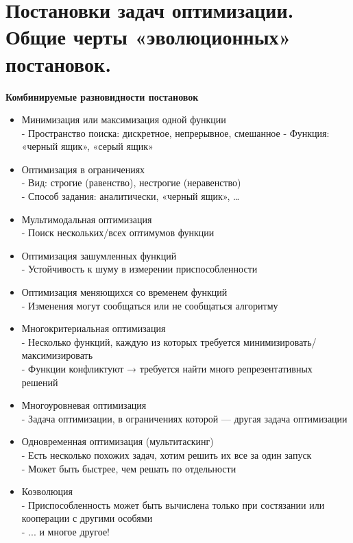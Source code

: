 \section{Постановки задач оптимизации. Общие черты «эволюционных» постановок.}
\begin{center}
     \textbf{Комбинируемые разновидности постановок\\}
\end{center}
\begin{itemize}
\item Минимизация или максимизация одной функции\\
- Пространство поиска: дискретное, непрерывное, смешанное
- Функция: «черный ящик», «серый ящик»
\item Оптимизация в ограничениях\\
- Вид: строгие (равенство), нестрогие (неравенство)\\
- Способ задания: аналитически, «черный ящик», …
\item Мультимодальная оптимизация\\
- Поиск нескольких/всех оптимумов функции
\item Оптимизация зашумленных функций \\
- Устойчивость к шуму в измерении приспособленности
\item Оптимизация меняющихся со временем функций\\
- Изменения могут сообщаться или не сообщаться алгоритму
\item Многокритериальная оптимизация\\
- Несколько функций, каждую из которых требуется минимизировать/максимизировать\\
- Функции конфликтуют → требуется найти много репрезентативных решений
\item Многоуровневая оптимизация\\
- Задача оптимизации, в ограничениях которой — другая задача оптимизации
\item Одновременная оптимизация (мультитаскинг)\\
- Есть несколько похожих задач, хотим решить их все за один запуск\\
- Может быть быстрее, чем решать по отдельности
\item Коэволюция\\
- Приспособленность может быть вычислена только при состязании или кооперации с другими особями \\
- ... и многое другое!\\


\end{itemize}
